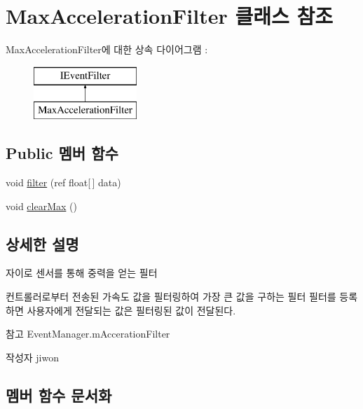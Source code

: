 \hypertarget{class_max_acceleration_filter}{}\section{Max\+Acceleration\+Filter 클래스 참조}
\label{class_max_acceleration_filter}
Max\+Acceleration\+Filter에 대한 상속 다이어그램 \+: \begin{figure}[H]
\begin{center}
\leavevmode
\includegraphics[height=2.000000cm]{class_max_acceleration_filter}
\end{center}
\end{figure}
\subsection*{Public 멤버 함수}
\begin{DoxyCompactItemize}
\item 
void \hyperlink{class_max_acceleration_filter_a59cde31f8ac45c09cb6636cc140feea6}{filter} (ref float\mbox{[}$\,$\mbox{]} data)
\item 
void \hyperlink{class_max_acceleration_filter_a3170f540e55ea996ec824e74df17b8d2}{clear\+Max} ()
\end{DoxyCompactItemize}


\subsection{상세한 설명}
자이로 센서를 통해 중력을 얻는 필터

컨트롤러로부터 전송된 가속도 값을 필터링하여 가장 큰 값을 구하는 필터 필터를 등록하면 사용자에게 전달되는 값은 필터링된 값이 전달된다. \begin{DoxySeeAlso}{참고}
Event\+Manager.\+m\+Acceration\+Filter 
\end{DoxySeeAlso}
\begin{DoxyAuthor}{작성자}
jiwon 
\end{DoxyAuthor}


\subsection{멤버 함수 문서화}
\hypertarget{class_max_acceleration_filter_a3170f540e55ea996ec824e74df17b8d2}{}
